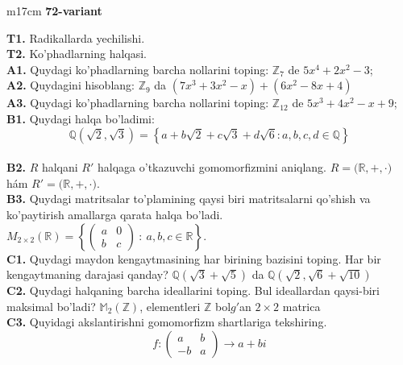 \documentclass{article}
\begin{document}
\begin{tabular}{m{17cm}}
\textbf{72-variant}
\newline

\textbf{T1.} Radikallarda yechilishi. \\
\textbf{T2.} Ko'phadlarning halqasi. \\
\textbf{A1.} Quydagi ko'phadlarning barcha nollarini toping:
\(\mathbb{Z}_{7}\) de \(5x^{4} + 2x^{2} - 3\); \\
\textbf{A2.} Quydagini hisoblang:
\(\mathbb{Z}_{9}\) da \(\left( 7x^{3} + 3x^{2} - x \right) + \left( 6x^{2} - 8x + 4 \right)\) \\
\textbf{A3.} Quydagi ko'phadlarning barcha nollarini toping:
\(\mathbb{Z}_{12}\) de \(5x^{3} + 4x^{2} - x + 9\); \\
\textbf{B1.} Quydagi halqa bo'ladimi:
\[\mathbb{Q}\left( \sqrt{2},\sqrt{3} \right) = \left\{ a + b\sqrt{2} + c\sqrt{3} + d\sqrt{6}:a,b,c,d \in \mathbb{Q} \right\}\] \\
\textbf{B2.} \(R\) halqani \(R'\) halqaga o'tkazuvchi gomomorfizmini aniqlang.
\(R\mathbb{= (R,} + , \cdot )\) hám \(R'\mathbb{= (R,} + , \cdot )\). \\
\textbf{B3.} Quydagi matritsalar to'plamining qaysi biri matritsalarni qo'shish va ko'paytirish amallarga qarata halqa bo'ladi.
\(M_{2 \times 2}\mathbb{(R) =}\left\{ \begin{pmatrix}
a & 0 \\
b & c
\end{pmatrix}\ :\ a,b,c \in \mathbb{R} \right\}\). \\
\textbf{C1.} Quydagi maydon kengaytmasining har birining bazisini toping. Har bir kengaytmaning darajasi qanday?
\(\mathbb{Q}\left( \sqrt{3} + \sqrt{5} \right)\) da \(\mathbb{Q}\left( \sqrt{2},\sqrt{6} + \sqrt{10} \right)\) \\
\textbf{C2.} Quydagi halqaning barcha ideallarini toping. Bul ideallardan qaysi-biri maksimal bo'ladi?
\(\mathbb{M}_{2}\left( \mathbb{Z} \right)\), elementleri \(\mathbb{Z}\) bol\(g'\)an \(2 \times 2\) matrica \\
\textbf{C3.} Quyidagi akslantirishni gomomorfizm shartlariga tekshiring.
\[f:\begin{pmatrix}
a & b \\
 - b & a
\end{pmatrix} \rightarrow a + bi\] \\

\end{tabular}
\vspace{1cm}
\end{document}

